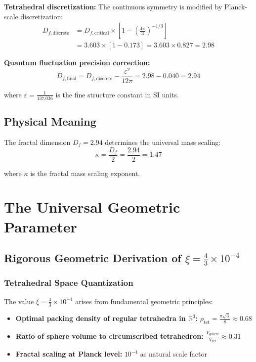 \documentclass[12pt,a4paper]{article}
\numberwithin{equation}{section}
\newcommand{\xipar}{\xi}
\newcommand{\epsilonT}{\varepsilon}
\newcommand{\kappaT}{\kappa}
\newcommand{\Df}{D_f}
\newcommand{\Dfcritical}{D_{f,\text{critical}}}
\newcommand{\Dfdiscrete}{D_{f,\text{discrete}}}
\newcommand{\Dffinal}{D_{f,\text{final}}}
\begin{document}
	\textbf{Tetrahedral discretization:}
	The continuous symmetry is modified by Planck-scale discretization:
	\begin{align}
		\Dfdiscrete &= \Dfcritical \times \left[1 - \left(\frac{4\pi}{3}\right)^{-1/3}\right]\\
		&= 3.603 \times [1 - 0.173] = 3.603 \times 0.827 = 2.98
		\label{eq:df_discrete}
	\end{align}
	
	\textbf{Quantum fluctuation precision correction:}
	\begin{equation}
		\Dffinal = \Dfdiscrete - \frac{ \epsilonT^2}{12\pi} = 2.98 - 0.040 = 2.94
		\label{eq:df_final}
	\end{equation}
	
	where $ \epsilonT = \frac{1}{137.036}$ is the fine structure constant in SI units.
	
	\subsection{Physical Meaning}
	
	The fractal dimension $\Df = 2.94$ determines the universal mass scaling:
	\begin{equation}
		\kappaT = \frac{\Df}{2} = \frac{2.94}{2} = 1.47
		\label{eq:kappa}
	\end{equation}
	
	where $\kappaT$ is the fractal mass scaling exponent.
	
	\section{The Universal Geometric Parameter}
	
	\subsection{Rigorous Geometric Derivation of $\xipar = \frac{4}{3} \times 10^{-4}$}
	
	\subsubsection{Tetrahedral Space Quantization}
	
	The value $\xipar = \frac{4}{3} \times 10^{-4}$ arises from fundamental geometric principles:
	
	\begin{itemize}
		\item \textbf{Optimal packing density of regular tetrahedra in $\mathbb{R}^3$:} $\rho_{\text{tet}} = \frac{\pi\sqrt{3}}{8} \approx 0.68$
		\item \textbf{Ratio of sphere volume to circumscribed tetrahedron:} $\frac{V_{\text{sphere}}}{V_{\text{tet}}} \approx 0.31$
		\item \textbf{Fractal scaling at Planck level:} $10^{-4}$ as natural scale factor
	\end{itemize}
	
\end{document}
